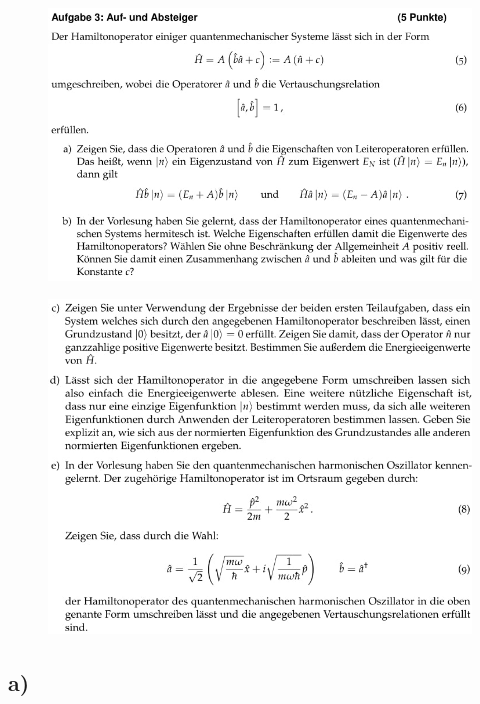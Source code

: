     \begin{figure}[H]
        \centering
        \includegraphics[width=\textwidth]{images/Aufgabe3ab.jpg}
        \label{fig:4}
    \end{figure}
    \begin{figure}[H]
        \centering
        \includegraphics[width=\textwidth]{images/Aufgabe3cde.jpg}
        \label{fig:5}
    \end{figure}

    \subsection{a)}

